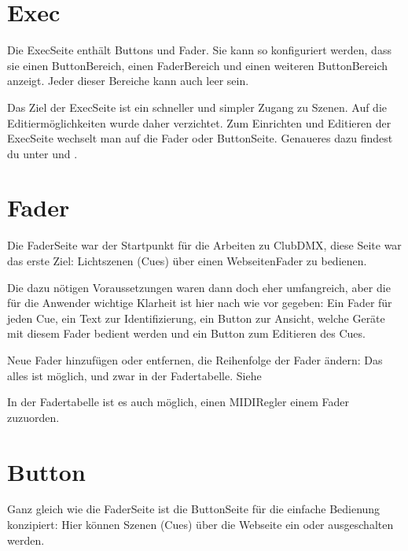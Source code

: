 \documentclass[letterpaper,10pt,ngerman]{sphinxmanual}
\begin{document}
\noindent{}


\section{Exec}
\label{\detokenize{navigation:exec}}
Die Exec\sphinxhyphen{}Seite enthält Buttons und Fader. Sie kann so konfiguriert werden,
dass sie einen Button\sphinxhyphen{}Bereich, einen Fader\sphinxhyphen{}Bereich und einen weiteren
Button\sphinxhyphen{}Bereich anzeigt. Jeder dieser Bereiche kann auch leer sein.

Das Ziel der Exec\sphinxhyphen{}Seite ist ein schneller und simpler Zugang zu Szenen.
Auf die Editiermöglichkeiten wurde daher verzichtet. Zum
Einrichten und Editieren der Exec\sphinxhyphen{}Seite wechselt man auf die Fader\sphinxhyphen{} oder
Button\sphinxhyphen{}Seite. Genaueres dazu findest du unter {\hyperref[\detokenize{einrichten:fader}]{}} und
{\hyperref[\detokenize{einrichten:buttons}]{}} .

\noindent{}


\section{Fader}
\label{\detokenize{navigation:fader}}
Die Fader\sphinxhyphen{}Seite war der Startpunkt für die Arbeiten zu ClubDMX, diese Seite
war das erste Ziel: Lichtszenen (Cues) über einen
Webseiten\sphinxhyphen{}Fader zu bedienen.

Die dazu nötigen Voraussetzungen waren dann doch eher umfangreich, aber die
für die Anwender wichtige Klarheit ist hier nach wie vor gegeben: Ein Fader für
jeden Cue,
ein Text zur Identifizierung, ein Button zur Ansicht, welche Geräte mit diesem
Fader bedient werden und ein Button zum Editieren des Cues.

Neue Fader hinzufügen oder entfernen, die Reihenfolge der Fader ändern: Das
alles ist möglich, und zwar in der Fadertabelle.
Siehe {\hyperref[\detokenize{einrichten:fader}]{}}

In der Fadertabelle ist es auch möglich, einen MIDI\sphinxhyphen{}Regler einem Fader
zuzuorden.


\section{Button}
\label{\detokenize{navigation:button}}
Ganz gleich wie die Fader\sphinxhyphen{}Seite ist die Button\sphinxhyphen{}Seite für die einfache
Bedienung konzipiert: Hier können Szenen (Cues) über die Webseite ein\sphinxhyphen{} oder
ausgeschalten werden.
\end{document}
